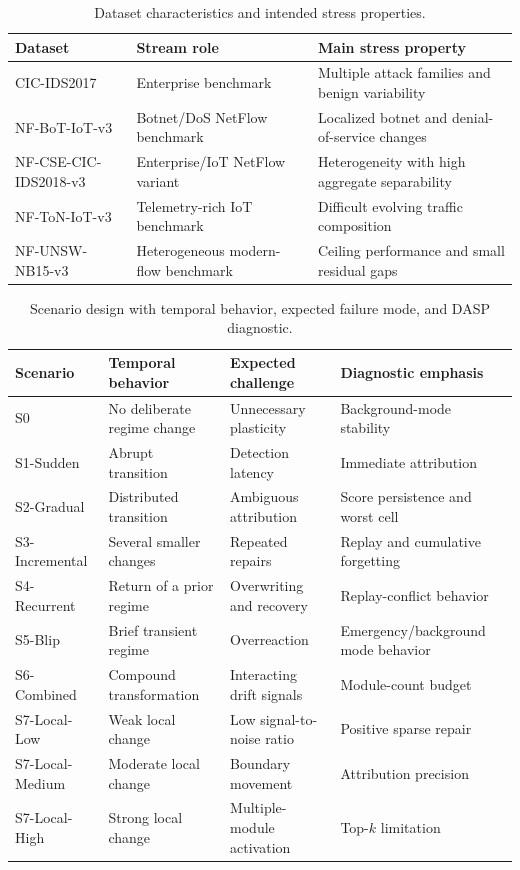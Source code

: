 \begin{table}[t]
\caption{Dataset characteristics and intended stress properties.}
\label{tab:dataset-manifest}
\centering
\begin{tabular}{p{}p{}p{}}
\toprule
Dataset & Stream role & Main stress property\\
\midrule
CIC-IDS2017 & Enterprise benchmark & Multiple attack families and benign variability\\
NF-BoT-IoT-v3 & Botnet/DoS NetFlow benchmark & Localized botnet and denial-of-service changes\\
NF-CSE-CIC-IDS2018-v3 & Enterprise/IoT NetFlow variant & Heterogeneity with high aggregate separability\\
NF-ToN-IoT-v3 & Telemetry-rich IoT benchmark & Difficult evolving traffic composition\\
NF-UNSW-NB15-v3 & Heterogeneous modern-flow benchmark & Ceiling performance and small residual gaps\\
\bottomrule
\end{tabular}
\end{table}

\begin{table}[t]
\caption{Scenario design with temporal behavior, expected failure mode, and DASP diagnostic.}
\label{tab:scenario-manifest-detail}
\centering
\scriptsize
\begin{tabular}{p{}p{}p{}p{}}
\toprule
Scenario & Temporal behavior & Expected challenge & Diagnostic emphasis\\
\midrule
S0 & No deliberate regime change & Unnecessary plasticity & Background-mode stability\\
S1-Sudden & Abrupt transition & Detection latency & Immediate attribution\\
S2-Gradual & Distributed transition & Ambiguous attribution & Score persistence and worst cell\\
S3-Incremental & Several smaller changes & Repeated repairs & Replay and cumulative forgetting\\
S4-Recurrent & Return of a prior regime & Overwriting and recovery & Replay-conflict behavior\\
S5-Blip & Brief transient regime & Overreaction & Emergency/background mode behavior\\
S6-Combined & Compound transformation & Interacting drift signals & Module-count budget\\
S7-Local-Low & Weak local change & Low signal-to-noise ratio & Positive sparse repair\\
S7-Local-Medium & Moderate local change & Boundary movement & Attribution precision\\
S7-Local-High & Strong local change & Multiple-module activation & Top-$k$ limitation\\
\bottomrule
\end{tabular}
\end{table}

